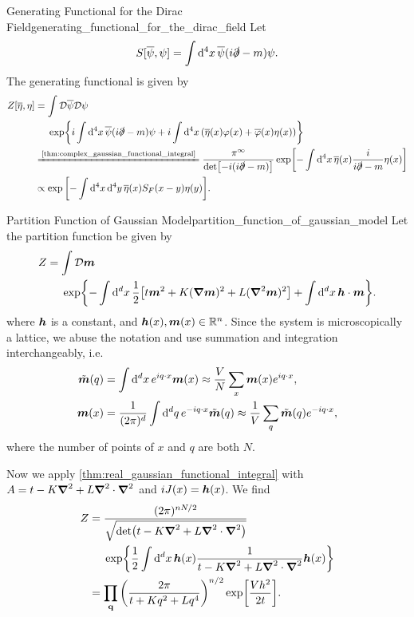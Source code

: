 \documentclass{article}
\begin{document}
\begin{example}{Generating Functional for the Dirac Field}{generating_functional_for_the_dirac_field}
    Let
    \[ S[\overline{\psi},\psi] = \int \dd{^4 x} \overline{\psi}(i\slashed{\partial} - m)\psi. \]
    The generating functional is given by
    \begin{align*}
        Z[\overline{\eta}, \eta] &= \int \mathcal{D}\overline{\psi} \mathcal{D}\psi \\
        &\phantom{{}={}} \exp{i\int \dd{^4 x} \overline{\psi}(i\slashed{\partial} - m)\psi + i \int \dd{^4 x} \qty(\overline{\eta}(x)\varphi(x) + \overline{\varphi}(x)\eta(x))} \\
        &\xlongequal{\text{\cref{thm:complex_gaussian_functional_integral}}} \frac{\pi^\infty}{\det [-i(i\slashed{\partial} - m)]} \exp[-\int \dd{^4 x} \overline{\eta}(x) \frac{i}{i\slashed{\partial} - m} \eta(x)] \\ 
        &\propto \exp\qty[-\int \dd{^4 x} \dd{^4 y} \overline{\eta}(x) S_F(x-y) \eta(y)].
    \end{align*}
\end{example}

\begin{example}{Partition Function of Gaussian Model}{partition_function_of_gaussian_model}
    Let the partition function be given by
    \begin{align*}
        Z &= \int \mathcal{D}\vb*{m} \\
        &\phantom{{}={}}\exp{-\int \dd{^d x} \frac{1}{2}\qty[t{\vb*{m}}^2 + K(\grad \vb*{m})^2 + L(\grad^2 \vb*{m})^2] + \int \dd{^d x} \vb*{h} \cdot \vb*{m}}.
    \end{align*}
    where $\vb*{h}$ is a constant, and $\vb*{h}(x), \vb*{m}(x) \in \mathbb{R}^n$.
    Since the system is microscopically a lattice, we abuse the notation and use summation and integration interchangeably, i.e.
    \begin{align*}
        \tilde{\vb*{m}}(q) &= \int \dd{^d x} e^{iq\cdot x} \vb*{m}(x) \approx \frac{V}{N} \sum_{x} \vb*{m}(x) e^{iq\cdot x}, \\
        \vb*{m}(x) &= \frac{1}{(2\pi)^d}\int \dd{^d q} e^{-iq\cdot x} \tilde{\vb*{m}}(q) \approx \frac{1}{V} \sum_{q} \tilde{\vb*{m}}(q) e^{-iq\cdot x},
    \end{align*}
    where the number of points of $x$ and $q$ are both $N$.
    \par
    Now we apply \cref{thm:real_gaussian_functional_integral} with $A = t - K\grad^2 + L \grad^2 \cdot \grad^2$ and $iJ(x) = \vb*{h}(x)$. We find
    \begin{align*}
        Z &= \frac{(2\pi)^{nN/2}}{\sqrt{\det (t - K\grad^2 + L \grad^2 \cdot \grad^2)}} \\
        &\phantom{{}={}}\exp{\frac{1}{2} \int \dd{^d x} \vb*{h}(x) \frac{1}{t - K\grad^2 + L \grad^2 \cdot \grad^2} \vb*{h}(x)} \\
        &= \prod_{\vb{q}} \qty(\frac{2\pi}{t + Kq^2 + Lq^4})^{n/2} \exp[\frac{Vh^2}{2t}].
    \end{align*}
\end{example}
\end{document}
